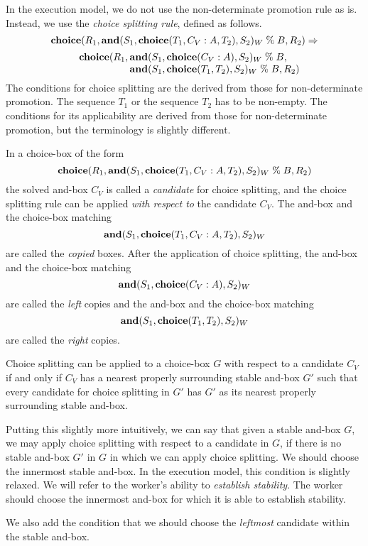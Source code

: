 In the execution model, we do not use the non-determinate promotion
rule as is.  Instead, we use the {\em choice splitting rule}, defined
as follows.
%
%
$$\vbox{\hbox{$\CHOICE(R_1, \AND(S_1, \CHOICE(T_1, C_V\wait A, T_2), S_2)_W \guard B, R_2) \rewriteto$}\vskip2mm\hbox{\hskip1cm\vbox{\hbox{$\CHOICE(R_1, \AND(S_1, \CHOICE(C_V \wait A), S_2)_W \guard B,$}\hbox{\setbox0=\hbox{$\CHOICE(R_1, \hbox{}$}\hskip\wd0$\AND(S_1, \CHOICE(T_1, T_2), S_2)_W \guard B, R_2)$}}}}$$
%
The conditions for choice splitting are the derived from those for
non-determinate promotion.  The sequence $T_1$ or the sequence $T_2$
has to be non-empty.  The conditions for its applicability are derived
from those for non-determinate promotion, but the terminology is
slightly different.

In a choice-box of the form%
%
$$\mbox{\bf choice}(R_1,\mbox{\bf and}(S_1, \mbox{\bf choice}(T_1, C_V \mathrel{\mbox{:}} A, T_2), S_2)_W \mathrel{\mbox{\%}} B, R_2)$$
%
the solved and-box $C_V$ is called a {\em candidate} for choice
splitting, and the choice splitting rule can be applied {\em with
respect to} the candidate $C_V$.  The and-box and the choice-box
matching
%
$$\mbox{\bf and}(S_1, \mbox{\bf choice}(T_1, C_V \mathrel{\mbox{:}} A, T_2), S_2)_W$$
%
are called the {\em copied} boxes.  After the application of choice
splitting, the and-box and the choice-box matching
%
$$\mbox{\bf and}(S_1, \mbox{\bf choice}(C_V \mathrel{\mbox{:}} A), S_2)_W$$
%
are called the {\em left} copies and the and-box and the choice-box
matching
%
$$\mbox{\bf and}(S_1, \mbox{\bf choice}(T_1, T_2), S_2)_W$$
%
are called the {\em right} copies.

Choice splitting can be applied to a choice-box $G$ with respect to a
candidate $C_V$ if and only if $C_V$ has a nearest properly
surrounding stable and-box $G'$ such that every candidate for choice
splitting in $G'$ has $G'$ as its nearest properly surrounding stable
and-box.

Putting this slightly more intuitively, we can say that given a stable
and-box $G$, we may apply choice splitting with respect to a candidate
in $G$, if there is no stable and-box $G'$ in $G$ in which we can
apply choice splitting.  We should choose the innermost stable
and-box.  In the execution model, this condition is slightly relaxed.
We will refer to the worker's ability to {\em establish stability}.
The worker should choose the innermost and-box for which it is able to
establish stability.%

We also add the condition that we should choose the {\em leftmost}
candidate within the stable and-box.

